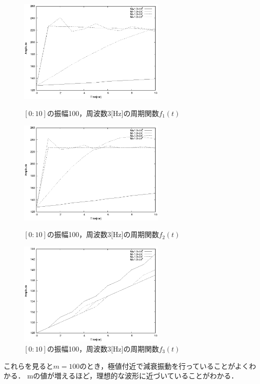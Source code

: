 \documentclass[titlepage]{jarticle}
\begin{document}
\begin{figure}[H]
  \begin{minipage}{0.495\hsize}
    \centering
    \includegraphics[width=7cm]{EPS/task_1_10.eps}
    \caption{$[0:10]$の振幅100，周波数3[Hz]の周期関数$f_{1}(t)$}
    \label{f_1_10:fig}
  \end{minipage}
  \begin{minipage}{0.495\hsize}
    \centering
    \includegraphics[width=7cm]{EPS/task_2_10.eps}
    \caption{$[0:10]$の振幅100，周波数3[Hz]の周期関数$f_{2}(t)$}
    \label{f_2_10:fig}
  \end{minipage}
  \begin{minipage}{0.495\hsize}
    \centering
    \includegraphics[width=7cm]{EPS/task_3_10.eps}
    \caption{$[0:10]$の振幅100，周波数3[Hz]の周期関数$f_{3}(t)$}
    \label{f_3_10:fig}
  \end{minipage}
\end{figure}
これらを見ると$m=100$のとき，極値付近で減衰振動を行っていることがよくわかる．
mの値が増えるほど，理想的な波形に近づいていることがわかる．
\end{document}
